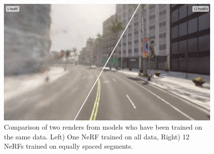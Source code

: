 \begin{figure}[!h]
    \centering
    \includegraphics[width=1.0\textwidth]{figures/block-nerf-comparison.png}
    \caption{Comparison of two renders from models who have been trained on the same data. Left) One NeRF trained on all data, Right) 12 NeRFs trained on equally spaced segments.}
    \label{fig:block-nerf-comparison}
\end{figure}